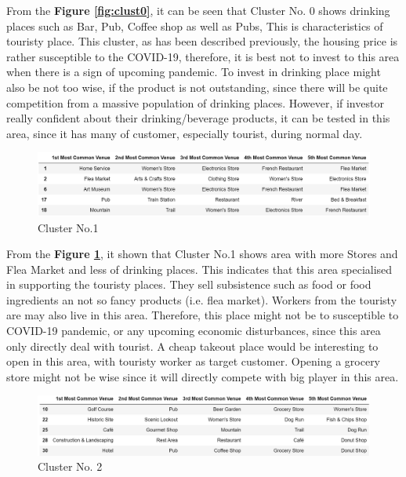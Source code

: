 \documentclass{homeworg}
\begin{document}
\FloatBarrier \par
From the \textbf{Figure \ref{fig:clust0}}, it can be seen that Cluster No. 0  shows drinking places such as Bar, Pub, Coffee shop as well as Pubs, This is characteristics of touristy place. This cluster, as has been described previously, the housing price is rather susceptible to the COVID-19, therefore, it is best not to invest to this area when there is a sign of upcoming pandemic. To invest in drinking place might also be not too wise, if the product is not outstanding, since there will be quite competition from a massive population of drinking places. However, if investor really confident about their drinking/beverage products, it can be tested in this area, since it has many of customer, especially tourist, during normal day.\par 
\begin{figure}[!ht]
    \centering
    \includegraphics[scale=0.8]{figure/Table_of_Cluster_1.png}
    \caption{Cluster No.1}
    \label{fig:clust1}
\end{figure}
\FloatBarrier \par
From the \textbf{Figure \ref{fig:clust1}}, it shown that Cluster No.1 shows area with more Stores and Flea Market and less of drinking places. This indicates that this area specialised in supporting the touristy places. They sell subsistence such as food or food ingredients an not so fancy products (i.e. flea market). Workers from the touristy are may also live in this area. Therefore, this place might not be to susceptible to COVID-19 pandemic, or any upcoming economic disturbances, since this area only directly deal with tourist. A cheap takeout place would be interesting to open in this area, with touristy worker as target customer. Opening a grocery store might not be wise since it will directly compete with big player in this area.\par
\begin{figure}[!ht]
    \centering
    \includegraphics[scale=0.8]{figure/Table_of_Cluster_2.png}
    \caption{Cluster No. 2}
    \label{fig:clust2}
\end{figure}
\end{document}
